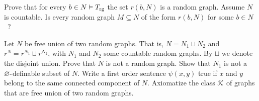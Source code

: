 \documentclass[creche.tex]{subfiles}
\begin{document}
\begin{exercise}
Prove that for every $b\in N\models T_{\rm rg}$ the set $r(b,N)$ is a random graph. Assume $N$ is countable. Is every random  graph $M\subseteq N$ of the form $r(b,N)$ for some $b\in N$~?\QED
\end{exercise}


\begin{exercise}\label{unionedisgiunta}
Let $N$ be free union of two random graphs. That is, $N=N_1\sqcup N_2$ and $r^N= r^{N_1}\sqcup r^{N_2}$, with $N_1$ and $N_2$ some countable random graphs. By $\sqcup$ we denote the disjoint union. Prove that $N$ is not a random graph. Show that $N_1$ is not a $\0\jj$definable subset of $N$. Write a first order sentence $\psi(x,y)$ true if $x$ and $y$ belong to the same connected component of $N$. Axiomatize the class $\K$ of graphs that are free union of two random graphs.\QED
\end{exercise}

%
%
\end{document}
